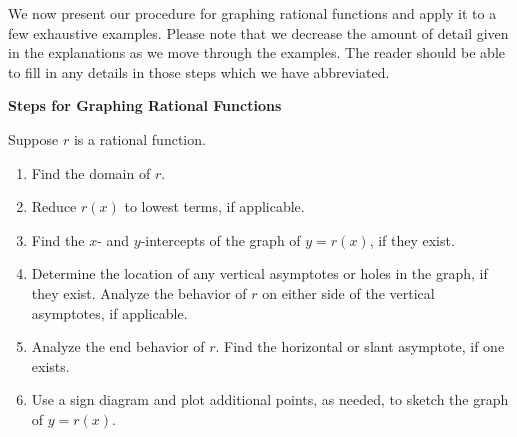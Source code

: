 \medskip 

We now present our procedure for graphing rational functions and apply it to a few exhaustive examples.  Please note that we decrease the amount of detail given in the explanations as we move through the examples.  The reader should be able to fill in any details in those steps which we have abbreviated.

\medskip

\colorbox{ResultColor}{\bbm

\centerline{\textbf{Steps for Graphing Rational Functions}}

\medskip

\hspace{.17in} Suppose $r$ is a rational function. 

\begin{enumerate}

\item  Find the domain of $r$.

\item  Reduce $r(x)$ to lowest terms, if applicable.

\item  Find the $x$- and $y$-intercepts of the graph of $y=r(x)$, if they exist.

\item  Determine the location of any vertical asymptotes or holes in the graph, if they exist.  Analyze the behavior of $r$ on either side of the vertical asymptotes, if applicable.

\item  Analyze the end behavior of $r$.  Find the horizontal or slant asymptote, if one exists.

\item  Use a sign diagram and plot additional points, as needed, to sketch the graph of $y=r(x)$.

\end{enumerate}

\ebm}

\bigskip

